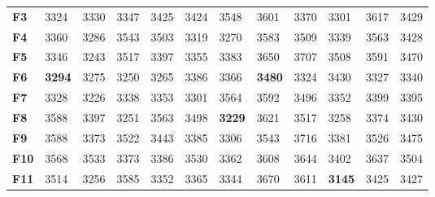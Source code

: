 \documentclass[runningheads]{llncs}
\begin{document}
\begin{table}
\begin{center}
\begin{tabular}{|l|l|l|l|l|l|l|l|l|l|l|l|}
      \textbf{F3}          & 3324                           & 3330                           & 3347                           & 3425 & 3424                           & 3548                           & 3601                           & 3370 & 3301                           & 3617 & 3429 \\
      \textbf{F4}          & 3360                           & 3286                           & 3543                           & 3503 & 3319                           & 3270                           & 3583                           & 3509 & 3339                           & 3563 & 3428 \\
      \textbf{F5}          & 3346                           & 3243                           & 3517                           & 3397 & 3355                           & 3383                           & 3650                           & 3707 & 3508                           & 3591 & 3470 \\
      \textbf{F6}          & \textbf{3294} & 3275                           & 3250                           & 3265 & 3386                           & 3366                           & \textbf{3480} & 3324 & 3430                           & 3327 & 3340 \\
      \textbf{F7}          & 3328                           & 3226                           & 3338                           & 3353 & 3301                           & 3564                           & 3592                           & 3496 & 3352                           & 3399 & 3395 \\
      \textbf{F8}          & 3588                           & 3397                           & 3251                           & 3563 & 3498                           & \textbf{3229} & 3621                           & 3517 & 3258                           & 3374 & 3430 \\
      \textbf{F9}          & 3588                           & 3373                           & 3522                           & 3443 & 3385                           & 3306                           & 3543                           & 3716 & 3381                           & 3526 & 3475 \\
      \textbf{F10}         & 3568                           & 3533                           & 3373                           & 3386 & 3530                           & 3362                           & 3608                           & 3644 & 3402                           & 3637 & 3504 \\
      \textbf{F11}         & 3514                           & 3256                           & 3585                           & 3352 & 3365                           & 3344                           & 3670                           & 3611 & \textbf{3145} & 3425 & 3427 \\

\end{tabular}
\end{center}
\end{table}
\end{document}
